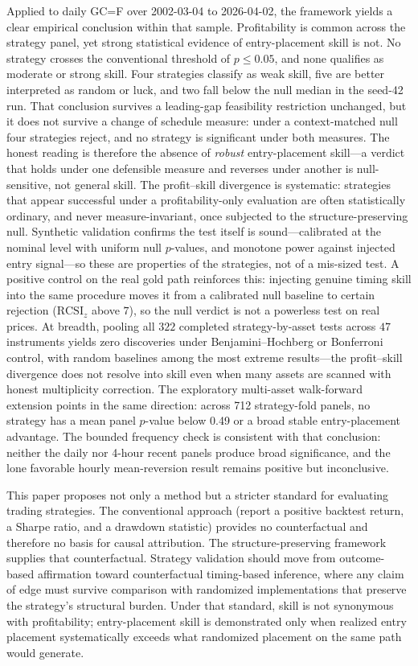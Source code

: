 \documentclass[preprint,12pt]{elsarticle}
\theoremstyle{definition}
\begin{document}
Applied to daily GC=F over 2002-03-04 to 2026-04-02, the framework yields a clear empirical conclusion within that sample. Profitability is common across the strategy panel, yet strong statistical evidence of entry-placement skill is not. No strategy crosses the conventional threshold of $p \le 0.05$, and none qualifies as moderate or strong skill. Four strategies classify as weak skill, five are better interpreted as random or luck, and two fall below the null median in the seed-42 run. That conclusion survives a leading-gap feasibility restriction unchanged, but it does not survive a change of schedule measure: under a context-matched null four strategies reject, and no strategy is significant under both measures. The honest reading is therefore the absence of \emph{robust} entry-placement skill---a verdict that holds under one defensible measure and reverses under another is null-sensitive, not general skill. The profit--skill divergence is systematic: strategies that appear successful under a profitability-only evaluation are often statistically ordinary, and never measure-invariant, once subjected to the structure-preserving null. Synthetic validation confirms the test itself is sound---calibrated at the nominal level with uniform null $p$-values, and monotone power against injected entry signal---so these are properties of the strategies, not of a mis-sized test. A positive control on the real gold path reinforces this: injecting genuine timing skill into the same procedure moves it from a calibrated null baseline to certain rejection ($\mathrm{RCSI}_z$ above $7$), so the null verdict is not a powerless test on real prices. At breadth, pooling all $322$ completed strategy-by-asset tests across $47$ instruments yields zero discoveries under Benjamini--Hochberg or Bonferroni control, with random baselines among the most extreme results---the profit--skill divergence does not resolve into skill even when many assets are scanned with honest multiplicity correction. The exploratory multi-asset walk-forward extension points in the same direction: across 712 strategy-fold panels, no strategy has a mean panel $p$-value below 0.49 or a broad stable entry-placement advantage. The bounded frequency check is consistent with that conclusion: neither the daily nor 4-hour recent panels produce broad significance, and the lone favorable hourly mean-reversion result remains positive but inconclusive.

This paper proposes not only a method but a stricter standard for evaluating trading strategies. The conventional approach (report a positive backtest return, a Sharpe ratio, and a drawdown statistic) provides no counterfactual and therefore no basis for causal attribution. The structure-preserving framework supplies that counterfactual. Strategy validation should move from outcome-based affirmation toward counterfactual timing-based inference, where any claim of edge must survive comparison with randomized implementations that preserve the strategy's structural burden. Under that standard, skill is not synonymous with profitability; entry-placement skill is demonstrated only when realized entry placement systematically exceeds what randomized placement on the same path would generate.
\end{document}

